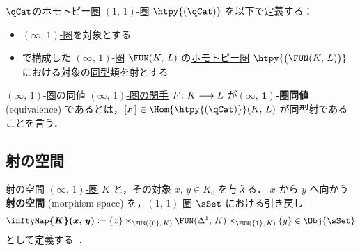 \documentclass[TQFT_main]{subfiles}
\begin{document}
\begin{mydef}[label=def:hqCat]{{$\qCat$}のホモトピー圏}
    $(1,\, 1)$-圏 $\htpy{(\qCat)}$ を以下で定義する：
    \begin{itemize}
        \item \hyperref[def:infinity-1]{$(\infty,\, 1)$-圏}を対象とする
        \item {}で構成した $(\infty,\, 1)$-圏 $\FUN(K,\, L)$ の\hyperref[def:hcat-infty]{ホモトピー圏} $\htpy{\bigl(\FUN(K,\, L)\bigr)}$ における対象の\hyperref[def:iso]{同型}類を射とする
    \end{itemize}
\end{mydef}

\begin{mydef}[label=def:equiv-infty]{{$(\infty,\, 1)$}-圏の同値}
    \hyperref[def:infinity-1]{$(\infty,\, 1)$-圏の関手} $F \colon K \longrightarrow L$ が\textbf{$\bm{(\infty,\, 1)}$-圏同値} (equivalence) であるとは，$[F] \in \Hom{\htpy{(\qCat)}}(K,\, L)$ が同型射であることを言う．
\end{mydef}

\subsection{射の空間}

\begin{mydef}[label=def:Map]{射の空間}
    \hyperref[def:infinity-1]{$(\infty,\, 1)$-圏} $K$ と，その対象 $x,\, y \in K_0$ を与える．
    $x$ から $y$ へ向かう\textbf{射の空間} (morphism space) を，$(1,\, 1)$-圏 $\sSet$ における引き戻し
    \begin{align}
        \bm{\inftyMap{K} (x,\, y)} \coloneqq \{x\} \times_{\FUN (\{0\},\, K)} \FUN (\Delta^1,\, K) \times_{\FUN (\{1\},\, K)} \{y\} \in \Obj{\sSet}
    \end{align}
    として定義する~\cite[\href{https://kerodon.net/tag/01J5}{Tag 01J5}]{kerodon}．
\end{mydef}
\end{document}
